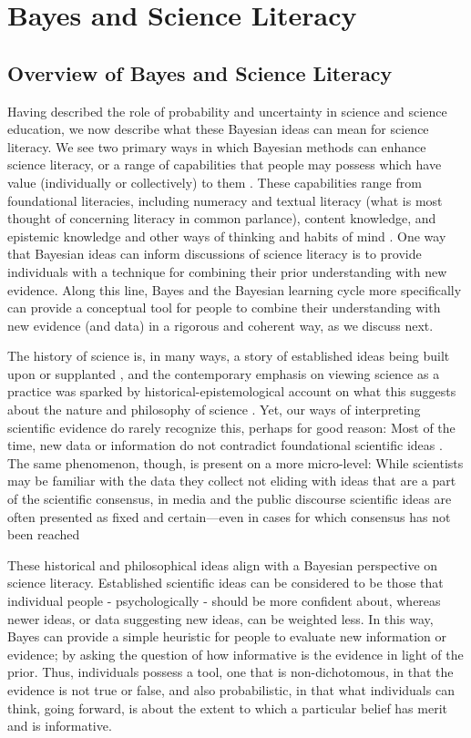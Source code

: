 \documentclass[man]{apa7}
\begin{document}
\section{Bayes and Science Literacy}

\subsection{Overview of Bayes and Science Literacy}

Having described the role of probability and uncertainty in science and science education, we now describe what these Bayesian ideas can mean for science literacy. We see two primary ways in which Bayesian methods can enhance science literacy, or a range of capabilities that people may possess which have value (individually or collectively) to them \parencite{council2016science}. These capabilities range from foundational literacies, including numeracy and textual literacy (what is most thought of concerning literacy in common parlance), content knowledge, and epistemic knowledge and other ways of thinking and habits of mind \parencite{council2016science}. One way that Bayesian ideas can inform discussions of science literacy is to provide individuals with a technique for combining their prior understanding with new evidence. Along this line, Bayes and the Bayesian learning cycle more specifically can provide a conceptual tool for people to combine their understanding with new evidence (and data) in a rigorous and coherent way, as we discuss next. 

The history of science is, in many ways, a story of established ideas being built upon or supplanted \parencite{fara2010science}, and the contemporary emphasis on viewing science as a practice was sparked by \textcite{k62} historical-epistemological account on what this suggests about the nature and philosophy of science \parencite{g09}. Yet, our ways of interpreting scientific evidence do rarely recognize this, perhaps for good reason: Most of the time, new data or information do not contradict foundational scientific ideas \parencite{k62}. The same phenomenon, though, is present on a more micro-level: While scientists may be familiar with the data they collect not eliding with ideas that are a part of the scientific consensus, in media and the public discourse scientific ideas are often presented as fixed and certain—even in cases for which consensus has not been reached \parencite{c87}

These historical and philosophical ideas align with a Bayesian perspective on science literacy. Established scientific ideas can be considered to be those that individual people - psychologically - should be more confident about, whereas newer ideas, or data suggesting new ideas, can be weighted less. In this way, Bayes can provide a simple heuristic for people to evaluate new information or evidence; by asking the question of how informative is the evidence in light of the prior. Thus, individuals possess a tool, one that is non-dichotomous, in that the evidence is not true or false, and also probabilistic, in that what individuals can think, going forward, is about the extent to which a particular belief has merit and is informative.
\end{document}
